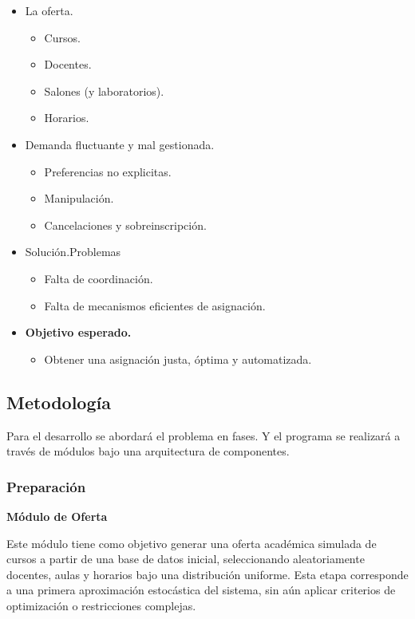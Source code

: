 \documentclass{article}
\begin{document}
\begin{itemize}
  \item La oferta.
        \begin{itemize}
          \item Cursos.
          \item Docentes.
          \item Salones (y laboratorios).
          \item Horarios.
        \end{itemize}
  \item Demanda fluctuante y mal gestionada.
        \begin{itemize}
          \item Preferencias no explicitas.
          \item Manipulación.
          \item Cancelaciones y sobreinscripción.
        \end{itemize}
  \item Solución.Problemas
        \begin{itemize}
          \item Falta de coordinación.
          \item Falta de mecanismos eficientes de asignación.
        \end{itemize}
  \item \textbf{Objetivo esperado.}
        \begin{itemize}
          \item Obtener una asignación justa, óptima y automatizada.
        \end{itemize}
\end{itemize}

\subsection{Metodología}

Para el desarrollo se abordará el problema en fases. Y el programa se realizará a través de módulos
bajo una arquitectura de componentes.

\subsubsection{Preparación}

\textbf{Módulo de Oferta}

Este módulo tiene como objetivo generar una oferta académica simulada de cursos a partir de una base 
de datos inicial, seleccionando aleatoriamente docentes, aulas y horarios bajo una distribución 
uniforme. Esta etapa corresponde a una primera aproximación estocástica del sistema, sin aún aplicar
criterios de optimización o restricciones complejas.\\
\end{document}
